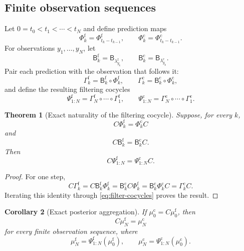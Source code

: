 \documentclass[11pt]{article}
\newtheorem{theorem}{Theorem}[section]
\newtheorem{corollary}[theorem]{Corollary}
\theoremstyle{definition}
\theoremstyle{remark}
\newcommand{\fine}{\mathrm f}
\newcommand{\coarse}{\mathrm c}
\newcommand{\Bup}{\mathsf B}
\begin{document}
\subsection{Finite observation sequences}
Let $0=t_0<t_1<\cdots<t_N$ and define prediction maps
\[
  \Phi_k^{\fine}=\Phi_{t_k-t_{k-1}}^{\fine},
  \qquad
  \Phi_k^{\coarse}=\Phi_{t_k-t_{k-1}}^{\coarse}.
\]
For observations $y_1,\ldots,y_N$, let
\[
  \Bup_k^{\fine}=\Bup_{\lambda_{y_k}^{\fine}},
  \qquad
  \Bup_k^{\coarse}=\Bup_{\lambda_{y_k}^{\coarse}}.
\]
Pair each prediction with the observation that follows it:
\[
  \Gamma_k^{\fine}
  =\Bup_k^{\fine}\circ\Phi_k^{\fine},
  \qquad
  \Gamma_k^{\coarse}
  =\Bup_k^{\coarse}\circ\Phi_k^{\coarse},
\]
and define the resulting filtering cocycles
\begin{equation}\label{eq:filter-cocycles}
  \Psi_{1:N}^{\fine}
  =\Gamma_N^{\fine}\circ\cdots\circ\Gamma_1^{\fine},
  \qquad
  \Psi_{1:N}^{\coarse}
  =\Gamma_N^{\coarse}\circ\cdots\circ\Gamma_1^{\coarse}.
\end{equation}

\begin{theorem}[Exact naturality of the filtering cocycle]\label{thm:exact-cocycle}
Suppose, for every $k$,
\begin{equation}\label{eq:step-flow-naturality}
  C\Phi_k^{\fine}=\Phi_k^{\coarse}C
\end{equation}
and
\begin{equation}\label{eq:step-bayes-naturality}
  C\Bup_k^{\fine}=\Bup_k^{\coarse}C.
\end{equation}
Then
\begin{equation}\label{eq:exact-cocycle-naturality}
  \boxed{
  C\Psi_{1:N}^{\fine}
  =
  \Psi_{1:N}^{\coarse}C.}
\end{equation}
\end{theorem}

\begin{proof}
For one step,
\[
  C\Gamma_k^{\fine}
  =C\Bup_k^{\fine}\Phi_k^{\fine}
  =\Bup_k^{\coarse}C\Phi_k^{\fine}
  =\Bup_k^{\coarse}\Phi_k^{\coarse}C
  =\Gamma_k^{\coarse}C.
\]
Iterating this identity through \eqref{eq:filter-cocycles} proves the result.
\end{proof}

\begin{corollary}[Exact posterior aggregation]\label{cor:exact-posterior}
If $\mu_0^{\coarse}=C\mu_0^{\fine}$, then
\[
  \boxed{C\mu_N^{\fine}=\mu_N^{\coarse}}
\]
for every finite observation sequence, where
\[
  \mu_N^{\fine}=\Psi_{1:N}^{\fine}(\mu_0^{\fine}),
  \qquad
  \mu_N^{\coarse}=\Psi_{1:N}^{\coarse}(\mu_0^{\coarse}).
\]
\end{corollary}
\end{document}
